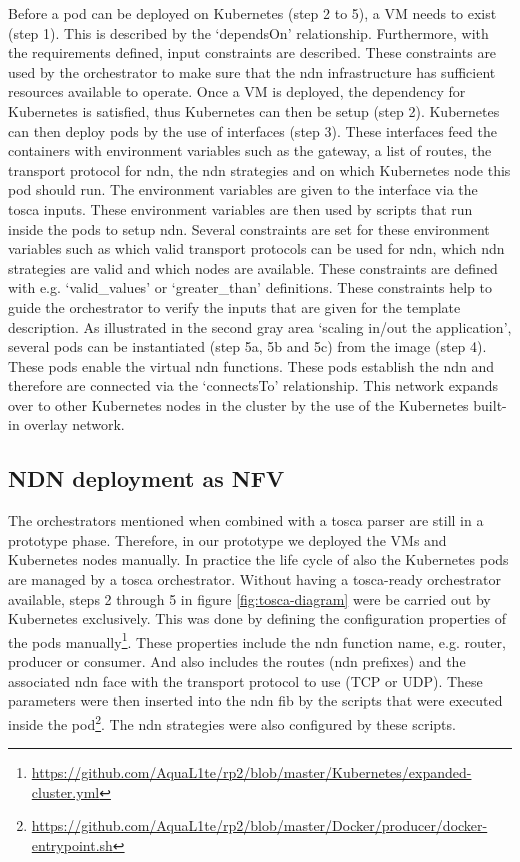 \documentclass[conference]{IEEEtran}
\begin{document}
Before a pod can be deployed on Kubernetes (step 2 to 5), a VM needs to exist (step 1). This is described by the `dependsOn' relationship. Furthermore, with the requirements defined, input constraints are described. These constraints are used by the orchestrator to make sure that the \gls{ndn} infrastructure has sufficient resources available to operate. Once a VM is deployed, the dependency for Kubernetes is satisfied, thus Kubernetes can then be setup (step 2). Kubernetes can then deploy pods by the use of interfaces (step 3). These interfaces feed the containers with environment variables such as the gateway, a list of routes, the transport protocol for \gls{ndn}, the \gls{ndn} strategies and on which Kubernetes node this pod should run. The environment variables are given to the interface via the \gls{tosca} inputs. These environment variables are then used by scripts that run inside the pods to setup \gls{ndn}. Several constraints are set for these environment variables such as which valid transport protocols can be used for \gls{ndn}, which \gls{ndn} strategies are valid and which nodes are available. These constraints are defined with e.g. `valid\_values' or `greater\_than' definitions. These constraints help to guide the orchestrator to verify the inputs that are given for the template description. As illustrated in the second gray area `scaling in/out the application', several pods can be instantiated (step 5a, 5b and 5c) from the image (step 4). These pods enable the virtual \gls{ndn} functions. These pods establish the \gls{ndn} and therefore are connected via the `connectsTo' relationship. This network expands over to other Kubernetes nodes in the cluster by the use of the Kubernetes built-in overlay network.

\subsection{NDN deployment as NFV}
The orchestrators mentioned when combined with a \gls{tosca} parser are still in a prototype phase. Therefore, in our prototype we deployed the VMs and Kubernetes nodes manually. In practice the life cycle of also the Kubernetes pods are managed by a \gls{tosca} orchestrator. Without having a \gls{tosca}-ready orchestrator available, steps 2 through 5 in figure \ref{fig:tosca-diagram} were be carried out by Kubernetes exclusively. This was done by defining the configuration properties of the pods manually\footnote{\url{https://github.com/AquaL1te/rp2/blob/master/Kubernetes/expanded-cluster.yml}}. These properties include the \gls{ndn} function name, e.g. router, producer or consumer. And also includes the routes (\gls{ndn} prefixes) and the associated \gls{ndn} face with the transport protocol to use (TCP or UDP). These parameters were then inserted into the \gls{ndn} \gls{fib} by the scripts that were executed inside the pod\footnote{\url{https://github.com/AquaL1te/rp2/blob/master/Docker/producer/docker-entrypoint.sh}}. The \gls{ndn} strategies were also configured by these scripts.
\end{document}
